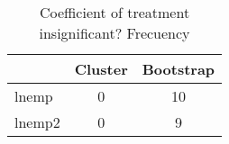 \begin{table}[htbp]\centering
\caption{Coefficient of treatment insignificant? Frecuency}
\begin{tabular}{l*{2}{c}}
\toprule
            &     Cluster&   Bootstrap\\
\midrule
lnemp       &           0&          10\\
lnemp2      &           0&           9\\
\bottomrule
\end{tabular}
\end{table}
